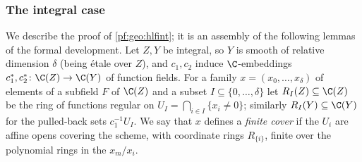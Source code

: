 \subsubsection{The integral case}

We describe the proof of \cref{pf:geo:hlfint}; it is an assembly of the following lemmas of the formal development. Let $Z,Y$ be
integral, so $Y$ is smooth of relative dimension $\delta$ (being \'etale over $Z$), and $c_1,c_2$ induce $\C$-embeddings
$c_1^*,c_2^*\colon\C(Z)\to\C(Y)$ of function fields. For a family $x=(x_0,\dots,x_\delta)$ of elements of a subfield $F$ of $\C(Z)$ and a subset
$I\subseteq\{0,\dots,\delta\}$ let $R_I(Z)\subseteq\C(Z)$ be the ring of functions regular on $U_I=\bigcap_{i\in I}\{x_i\ne0\}$; similarly
$R_I(Y)\subseteq\C(Y)$ for the pulled-back sets $c_1^{-1}U_I$. We say that $x$ defines a \emph{finite cover} if the $U_i$ are affine opens covering
the scheme, with coordinate rings $R_{\{i\}}$, finite over the polynomial rings in the $x_m/x_i$.

